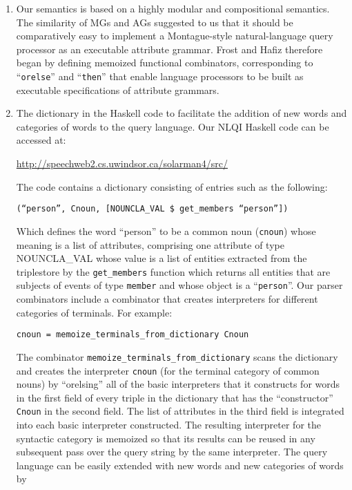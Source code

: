\documentclass[../main.tex]{subfiles}
\begin{document}
\begin{refsection}
\begin{enumerate}
	\item Our semantics is based on a highly modular and compositional semantics. The similarity of MGs and AGs suggested to us that it should
	be comparatively easy to implement a Montague-style natural-language query processor as an
	executable attribute grammar.  Frost and Hafiz \cite{frosthafiz2008} therefore began by defining memoized functional combinators, corresponding to ``\texttt{orelse}'' and ``\texttt{then}'' that enable language processors to be built as executable specifications of attribute grammars.

	\item The dictionary in the Haskell code to facilitate the addition of new words and
	categories of words to the query language. Our NLQI Haskell code can be accessed at:
	\begin{center} \url{http://speechweb2.cs.uwindsor.ca/solarman4/src/} \end{center}
	The code contains a dictionary consisting of entries such as the following:
	\begin{center} \texttt{(``person'', Cnoun, [NOUNCLA\_VAL \$ get\_members ``person''])} \end{center}
	Which defines the word ``person'' to be a common noun (\texttt{cnoun}) whose meaning is a
	list of attributes, comprising one attribute of type NOUNCLA\_VAL whose value is a list of
	entities extracted from the triplestore by the \texttt{get\_members} function which returns all entities
	that are subjects of events of type \texttt{member} and whose object is a ``\texttt{person}''. Our parser
	combinators include a combinator that creates interpreters for different categories of terminals.
	For example:
	\begin{center} \texttt{cnoun = memoize\_terminals\_from\_dictionary Cnoun} \end{center}
	The combinator \texttt{memoize\_terminals\_from\_dictionary} scans the dictionary and
	creates the interpreter \texttt{cnoun} (for the terminal category of common nouns) by ``orelsing''
	all of the basic interpreters that it constructs for words in the first field of every triple in the
	dictionary that has the ``constructor'' \texttt{Cnoun} in the second field. The list of attributes in the
	third field is integrated into each basic interpreter constructed. The resulting interpreter for the
	syntactic category is memoized so that its results can be reused in any subsequent pass over the
	query string by the same interpreter.
	The query language can be easily extended with new words and new categories of words by

\end{enumerate}
\end{refsection}
\end{document}
